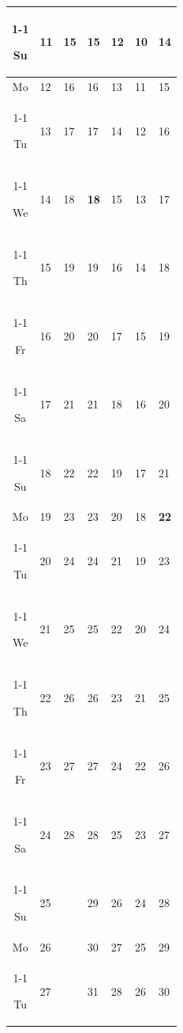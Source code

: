 \documentclass[a4paper]{article}
\newcommand{\datestrut}{\rule{0pt}{12pt}}
\begin{document}
\begin{center}
\begin{tabular}{|c||p{2.5cm}|p{2.5cm}|p{2.5cm}|p{2.5cm}|p{2.5cm}|p{2.5cm}|}
\cline{1-1}\cline{2-2}\cline{3-3}\cline{4-4}\cline{5-5}\cline{6-6}\cline{7-7}
\datestrut Su & 11 & 15 & 15 & 12 & 10 & 14 \\
\hline\hline
\datestrut Mo & 12 & 16 & 16 & 13 & 11 & 15 \\
\cline{1-1}\cline{2-2}\cline{3-3}\cline{4-4}\cline{5-5}\cline{6-6}\cline{7-7}
\datestrut Tu & 13 & 17 & 17 & 14 & 12 & 16 \\
\cline{1-1}\cline{2-2}\cline{3-3}\cline{4-4}\cline{5-5}\cline{6-6}\cline{7-7}
\datestrut We & 14 & 18 & \textbf{18} & 15 & 13 & 17 \\
\cline{1-1}\cline{2-2}\cline{3-3}\cline{4-4}\cline{5-5}\cline{6-6}\cline{7-7}
\datestrut Th & 15 & 19 & 19 & 16 & 14 & 18 \\
\cline{1-1}\cline{2-2}\cline{3-3}\cline{4-4}\cline{5-5}\cline{6-6}\cline{7-7}
\datestrut Fr & 16 & 20 & 20 & 17 & 15 & 19 \\
\cline{1-1}\cline{2-2}\cline{3-3}\cline{4-4}\cline{5-5}\cline{6-6}\cline{7-7}
\datestrut Sa & 17 & 21 & 21 & 18 & 16 & 20 \\
\cline{1-1}\cline{2-2}\cline{3-3}\cline{4-4}\cline{5-5}\cline{6-6}\cline{7-7}
\datestrut Su & 18 & 22 & 22 & 19 & 17 & 21 \\
\hline\hline
\datestrut Mo & 19 & 23 & 23 & 20 & 18 & \textbf{22} \\
\cline{1-1}\cline{2-2}\cline{3-3}\cline{4-4}\cline{5-5}\cline{6-6}\cline{7-7}
\datestrut Tu & 20 & 24 & 24 & 21 & 19 & 23 \\
\cline{1-1}\cline{2-2}\cline{3-3}\cline{4-4}\cline{5-5}\cline{6-6}\cline{7-7}
\datestrut We & 21 & 25 & 25 & 22 & 20 & 24 \\
\cline{1-1}\cline{2-2}\cline{3-3}\cline{4-4}\cline{5-5}\cline{6-6}\cline{7-7}
\datestrut Th & 22 & 26 & 26 & 23 & 21 & 25 \\
\cline{1-1}\cline{2-2}\cline{3-3}\cline{4-4}\cline{5-5}\cline{6-6}\cline{7-7}
\datestrut Fr & 23 & 27 & 27 & 24 & 22 & 26 \\
\cline{1-1}\cline{2-2}\cline{3-3}\cline{4-4}\cline{5-5}\cline{6-6}\cline{7-7}
\datestrut Sa & 24 & 28 & 28 & 25 & 23 & 27 \\
\cline{1-1}\cline{2-2}\cline{3-3}\cline{4-4}\cline{5-5}\cline{6-6}\cline{7-7}
\datestrut Su & 25 &  & 29 & 26 & 24 & 28 \\
\hline\hline
\datestrut Mo & 26 &  & 30 & 27 & 25 & 29 \\
\cline{1-1}\cline{2-2}\cline{4-4}\cline{5-5}\cline{6-6}\cline{7-7}
\datestrut Tu & 27 &  & 31 & 28 & 26 & 30 \\

\end{tabular}
\end{center}
\end{document}
